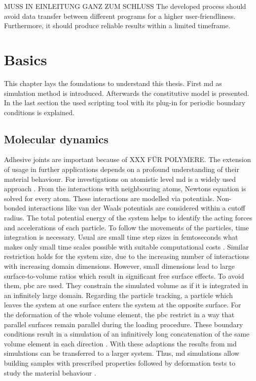 

MUSS IN EINLEITUNG GANZ ZUM SCHLUSS
The developed process should avoid data transfer between different programs for a higher user-friendliness. Furthermore, it should produce reliable results within a limited timeframe. 


\chapter{Basics} \label{chap: basics}
This chapter lays the foundations to understand this thesis. First \acrfull{md} as simulation method is introduced. Afterwards the constitutive model is presented. In the last section the used scripting tool with its plug-in for periodic boundary conditions is explained.  

\section{Molecular dynamics} \label{sec: MDBasics}
Adhesive joints are important because of XXX FÜR POLYMERE. The extension of usage in further applications depends on a profound understanding of their material behaviour. For investigations on atomistic level \acrfull{md} is a widely used approach  \cite{ries_mechanical_2024}. From the interactions with neighbouring atoms, Newtons equation is solved for every atom. These interactions are modelled via potentials. Non-bonded interactions like van der Waals potentials are considered within a cutoff radius. The total potential energy of the system helps to identify the acting forces and accelerations of each particle. To follow the movements of the particles, time integration is necessary. Usual are small time step sizes in femtoseconds what makes only small time scales possible with suitable computational costs \cite{ries_mechanical_2024}. Similar restriction holds for the system size, due to the increasing number of interactions with increasing domain dimensions. However, small dimensions lead to large surface-to-volume ratios which result in significant free surface effects. To avoid them, \acrfull{pbc} are used. They constrain the simulated volume as if it is integrated in an infinitely large domain. Regarding the particle tracking, a particle which leaves the system at one surface enters the system at the opposite surface. For the deformation of the whole volume element, the \acrshort{pbc} restrict in a way that parallel surfaces remain parallel during the loading procedure. These boundary conditions result in a simulation of an infinitively long concatenation of the same volume element in each direction \cite{gorbunov_periodic_2022}.
With these adaptions the results from \acrshort{md} simulations can be transferred to a larger system. 
Thus, \acrshort{md} simulations allow building samples with prescribed properties followed by deformation tests to study the material behaviour \cite{buyukozturk_structural_2011}. 


